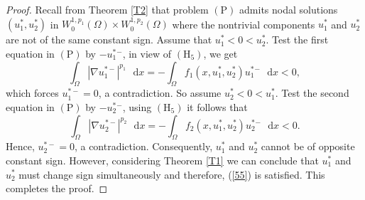 \documentclass[10pt,a4paper]{amsart}
\begin{document}
\begin{proof}
Recall from Theorem \ref{T2} that problem $(\mathrm{P})$ admits nodal
solutions $(u_{1}^{\ast },u_{2}^{\ast })$ in $W_{0}^{1,p_{1}}(\Omega )\times
W_{0}^{1,p_{2}}(\Omega )$ where the nontrivial components $u_{1}^{\ast }$
and $u_{2}^{\ast }$ are not of the same constant sign. Assume that $%
u_{1}^{\ast }<0<u_{2}^{\ast }$. Test the first equation in $(\mathrm{P})$ by 
$-u_{1}^{\ast }{}^{-}$, in view of $(\mathrm{H}_{5})$, we get 
\begin{equation*}
\int_{\Omega }|\nabla u_{1}^{\ast -}|^{p_{1}}\text{ }\mathrm{d}%
x=-\int_{\Omega }f_{1}(x,u_{1}^{\ast },u_{2}^{\ast })u_{1}^{\ast }{}^{-}%
\text{ }\mathrm{d}x<0,
\end{equation*}%
which forces $u_{1}^{\ast -}=0$, a contradiction. So assume $u_{2}^{\ast
}<0<u_{1}^{\ast }$. Test the second equation in $(\mathrm{P})$ by $%
-u_{2}^{\ast }{}^{-}$, using $(\mathrm{H}_{5})$ it follows that 
\begin{equation*}
\int_{\Omega }|\nabla u_{2}^{\ast -}|^{p_{2}}\text{ }\mathrm{d}%
x=-\int_{\Omega }f_{2}(x,u_{1}^{\ast },u_{2}^{\ast })u_{2}^{\ast }{}^{-}%
\text{ }\mathrm{d}x<0.
\end{equation*}%
Hence, $u_{2}^{\ast -}=0$, a contradiction. Consequently, $u_{1}^{\ast }$
and $u_{2}^{\ast }$ cannot be of opposite constant sign. However,
considering Theorem \ref{T1} we can conclude that $u_{1}^{\ast }$ and $%
u_{2}^{\ast }$ must change sign simultaneously and therefore, (\ref{55}) is
satisfied. This completes the proof.
\end{proof}
\end{document}

